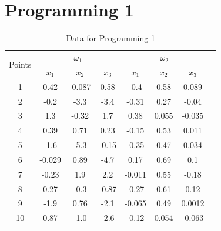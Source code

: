 \documentclass{article}
\theoremstyle{definition}
\theoremstyle{definition}
\theoremstyle{remark}
\begin{document}
\section*{Programming 1}
\begin{table}
\centering
\begin{tabular}{|c|c|c|c|c|c|c|c|}
\hline
\multirow{2}{*}{Points} & \multicolumn{3}{|c|}{$\omega_1$} & \multicolumn{3}{|c|}{$\omega_2$} \\
\cline{2-7}
& $x_1$ & $x_2$ & $x_3$ & $x_1$ & $x_2$ & $x_3$ \\
\hline
1 & 0.42 & -0.087 & 0.58 & -0.4 & 0.58 & 0.089\\
\hline
2 & -0.2 & -3.3 & -3.4 & -0.31 & 0.27 & -0.04\\
\hline
3 & 1.3 & -0.32 & 1.7 & 0.38 & 0.055 & -0.035\\
\hline
4 & 0.39 & 0.71 & 0.23 & -0.15 & 0.53 & 0.011\\
\hline
5 & -1.6 & -5.3 & -0.15 & -0.35 & 0.47 & 0.034\\
\hline
6 & -0.029 & 0.89 & -4.7 & 0.17 & 0.69 & 0.1\\
\hline
7 & -0.23 & 1.9 & 2.2 & -0.011 & 0.55 & -0.18\\
\hline
8 & 0.27 & -0.3 & -0.87 & -0.27 & 0.61 & 0.12\\
\hline
9 & -1.9 & 0.76 & -2.1 & -0.065 & 0.49 & 0.0012\\
\hline
10 & 0.87 & -1.0 & -2.6 & -0.12 & 0.054 & -0.063\\
\hline

\end{tabular}
\caption{Data for Programming 1}
\end{table}
\end{document}
